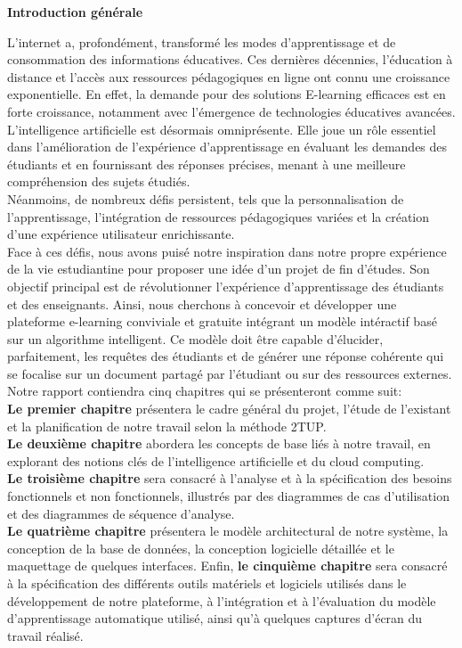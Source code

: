 \thispagestyle{plain} 
\begin{center}
  \textbf{\Huge Introduction générale}
\end{center}

\noindent L'internet a, profondément, transformé les modes d'apprentissage et de consommation des informations éducatives. Ces dernières décennies, l'éducation à distance et l'accès aux ressources pédagogiques en ligne ont connu une croissance exponentielle. En effet, la demande pour des solutions E-learning efficaces est en forte croissance, notamment avec l'émergence de technologies éducatives avancées. L’intelligence artificielle est désormais omniprésente. Elle joue un rôle essentiel dans l'amélioration de l'expérience d'apprentissage en évaluant les demandes des étudiants et en fournissant des réponses précises, menant à une meilleure compréhension des sujets étudiés.\\
\noindent Néanmoins, de nombreux défis persistent, tels que la personnalisation de l'apprentissage, l'intégration de ressources pédagogiques variées et la création d'une expérience utilisateur enrichissante. \\
\noindent Face à ces défis, nous avons puisé notre inspiration dans notre propre expérience de la vie estudiantine pour proposer une idée d’un projet de fin d’études. Son objectif principal est de révolutionner l'expérience d'apprentissage des étudiants et des enseignants. Ainsi, nous cherchons à concevoir et développer une plateforme e-learning conviviale et gratuite intégrant un modèle intéractif basé sur un algorithme intelligent. Ce modèle doit être capable d'élucider, parfaitement, les requêtes des étudiants et de générer une réponse cohérente qui se focalise sur un document partagé par l’étudiant ou sur des ressources externes. \\
\noindent Notre rapport contiendra cinq chapitres qui se présenteront comme suit: \\
\textbf{Le premier chapitre} présentera le cadre général du projet, l'étude de l'existant et la planification de notre travail selon la méthode 2TUP.\\
\textbf{Le deuxième chapitre} abordera les concepts de base liés à notre travail, en explorant des notions clés de l'intelligence artificielle et du cloud computing.\\
\textbf{Le troisième chapitre} sera consacré à l'analyse et à la spécification des besoins fonctionnels et non fonctionnels, illustrés par des diagrammes de cas d'utilisation et des diagrammes de séquence d'analyse.\\
\textbf{Le quatrième chapitre} présentera le modèle architectural de notre système, la conception de la base de données, la conception logicielle détaillée et le maquettage de quelques interfaces. Enfin, \textbf{le cinquième chapitre} sera consacré à la spécification des différents outils matériels et logiciels utilisés dans le développement de notre plateforme, à l'intégration et à l'évaluation du modèle d’apprentissage automatique utilisé, ainsi qu'à quelques captures d'écran du travail réalisé.